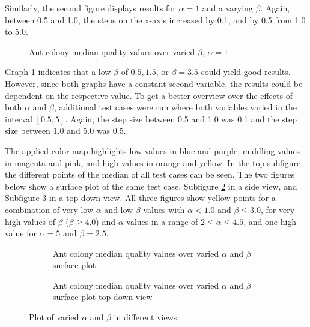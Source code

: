 Similarly, the second figure displays results for $\alpha = 1$ and a varying $\beta$.
Again, between 0.5 and 1.0, the steps on the x-axis increased by 0.1, and by 0.5 from 1.0 to 5.0.


\begin{figure}
	\centering
	
	\caption{Ant colony median quality values over varied $\beta$, $\alpha = 1$}
	\label{fig:antColonyCasesBetaVariedMed}
\end{figure}

Graph \ref{fig:antColonyCasesBetaVariedMed} indicates that a low $\beta$ of  $0.5, 1.5$, or $\beta = 3.5$ could yield good results.
However, since both graphs have a constant second variable, the results could be dependent on the respective value.
To get a better overview over the effects of both $\alpha$ and $\beta$, additional test cases were run where both variables varied in the interval $[0.5, 5]$.
Again, the step size between 0.5 and 1.0 was 0.1 and the step size between 1.0 and 5.0 was 0.5.

The applied color map highlights low values in blue and purple, middling values in magenta and pink, and high values in orange and yellow.
In the top subfigure, the different points of the median of all test cases can be seen.
The two figures below show a surface plot of the same test case, Subfigure \ref{fig:antColonyCasesAlphaAndBetaVariedMedSurface} in a side view, and Subfigure \ref{fig:antColonyCasesAlphaAndBetaVariedMedTopDown} in a top-down view. 
All three figures show yellow points for a combination of very low $\alpha$ and low $\beta$ values with $\alpha < 1.0$ and $\beta \leq 3.0$, for very high values of $\beta$ ($\beta \geq 4.0$) and $\alpha$ values in a range of $2 \leq \alpha \leq 4.5$, and one high value for $\alpha = 5$ and $\beta = 2.5$.

\begin{figure}
	\begin{subfigure}{0.48\textwidth}
		
		\caption{Ant colony median quality values over varied $\alpha$ and $\beta$ surface plot}
		\label{fig:antColonyCasesAlphaAndBetaVariedMedSurface}
	\end{subfigure}
	\hfill
	\begin{subfigure}{0.48\textwidth}
		
		\caption{Ant colony median quality values over varied $\alpha$ and $\beta$ surface plot top-down view}
		\label{fig:antColonyCasesAlphaAndBetaVariedMedTopDown}
	\end{subfigure}
	\caption{Plot of varied $\alpha$ and $\beta$ in different views}
	\label{fig:antColonyCasesAlphaAndBetaVariedMedAll}
\end{figure}



